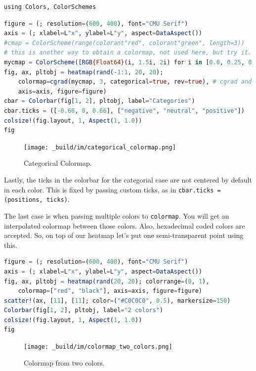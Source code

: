 \documentclass[
  notoc %
]{tufte-book}
\newcommand{\passthrough}[1]{#1}
\begin{document}
\begin{lstlisting}
using Colors, ColorSchemes
\end{lstlisting}

\begin{lstlisting}[language=Julia]
figure = (; resolution=(600, 400), font="CMU Serif")
axis = (; xlabel=L"x", ylabel=L"y", aspect=DataAspect())
#cmap = ColorScheme(range(colorant"red", colorant"green", length=3))
# this is another way to obtain a colormap, not used here, but try it.
mycmap = ColorScheme([RGB{Float64}(i, 1.5i, 2i) for i in [0.0, 0.25, 0.35, 0.5]])
fig, ax, pltobj = heatmap(rand(-1:1, 20, 20);
    colormap=cgrad(mycmap, 3, categorical=true, rev=true), # cgrad and Symbol, mycmap
    axis=axis, figure=figure)
cbar = Colorbar(fig[1, 2], pltobj, label="Categories")
cbar.ticks = ([-0.66, 0, 0.66], ["negative", "neutral", "positive"])
colsize!(fig.layout, 1, Aspect(1, 1.0))
fig
\end{lstlisting}

\begin{figure}
\hypertarget{fig:categorical_colormap}{%
\centering
\texttt{[image: \_build/im/categorical\_colormap.png]}
\caption{Categorical Colormap.}\label{fig:categorical_colormap}
}
\end{figure}

Lastly, the ticks in the colorbar for the categorial case are not
centered by default in each color. This is fixed by passing custom
ticks, as in \passthrough{\lstinline!cbar.ticks = (positions, ticks)!}.

The last case is when passing multiple colors to
\passthrough{\lstinline!colormap!}. You will get an interpolated
colormap between those colors. Also, hexadecimal coded colors are
accepted. So, on top of our heatmap let's put one semi-transparent point
using this.

\begin{lstlisting}[language=Julia]
figure = (; resolution=(600, 400), font="CMU Serif")
axis = (; xlabel=L"x", ylabel=L"y", aspect=DataAspect())
fig, ax, pltobj = heatmap(rand(20, 20); colorrange=(0, 1),
    colormap=["red", "black"], axis=axis, figure=figure)
scatter!(ax, [11], [11]; color=("#C0C0C0", 0.5), markersize=150)
Colorbar(fig[1, 2], pltobj, label="2 colors")
colsize!(fig.layout, 1, Aspect(1, 1.0))
fig
\end{lstlisting}

\begin{figure}
\hypertarget{fig:colormap_two_colors}{%
\centering
\texttt{[image: \_build/im/colormap\_two\_colors.png]}
\caption{Colormap from two colors.}\label{fig:colormap_two_colors}
}
\end{figure}
\end{document}
